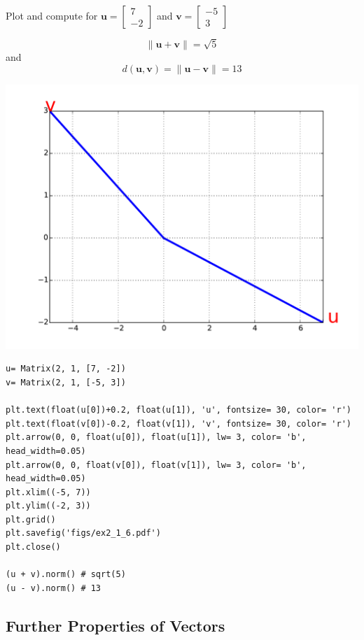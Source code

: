Plot and compute for $\mathbf{u} = \left[\begin{matrix}7\\-2\end{matrix}\right]$
and $\mathbf{v} = \left[\begin{matrix}-5\\3\end{matrix}\right]$

$$\|\mathbf{u} + \mathbf{v} \| = \sqrt{5}$$
and
$$d(\mathbf{u}, \mathbf{v}) = \|\mathbf{u} - \mathbf{v} \| = 13$$

\includegraphics[width=\linewidth]{figs/ex2_1_6.pdf}

\begin{verbatim}
u= Matrix(2, 1, [7, -2])
v= Matrix(2, 1, [-5, 3])

plt.text(float(u[0])+0.2, float(u[1]), 'u', fontsize= 30, color= 'r')
plt.text(float(v[0])-0.2, float(v[1]), 'v', fontsize= 30, color= 'r')
plt.arrow(0, 0, float(u[0]), float(u[1]), lw= 3, color= 'b', head_width=0.05)
plt.arrow(0, 0, float(v[0]), float(v[1]), lw= 3, color= 'b', head_width=0.05)
plt.xlim((-5, 7))
plt.ylim((-2, 3))
plt.grid()
plt.savefig('figs/ex2_1_6.pdf')
plt.close()

(u + v).norm() # sqrt(5)
(u - v).norm() # 13
\end{verbatim}


\subsection{Further Properties of Vectors}

